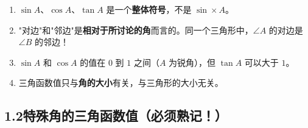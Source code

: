 \documentclass[12pt, a4paper]{ctexart}
\begin{document}
\begin{warnbox}[易错提醒]
\begin{enumerate}[nosep, leftmargin=1.5em]
  \item $\sin A$、$\cos A$、$\tan A$ 是一个\textbf{整体符号}，不是 $\sin\times A$。
  \item "对边"和"邻边"是\textbf{相对于所讨论的角}而言的。同一个三角形中，$\angle A$ 的对边是 $\angle B$ 的邻边！
  \item $\sin A$ 和 $\cos A$ 的值在 $0$ 到 $1$ 之间（$A$ 为锐角），但 $\tan A$ 可以大于 $1$。
  \item 三角函数值只与\textbf{角的大小}有关，与三角形的大小无关。
\end{enumerate}
\end{warnbox}

\subsection*{1.2\quad 特殊角的三角函数值（必须熟记！）}
\end{document}
